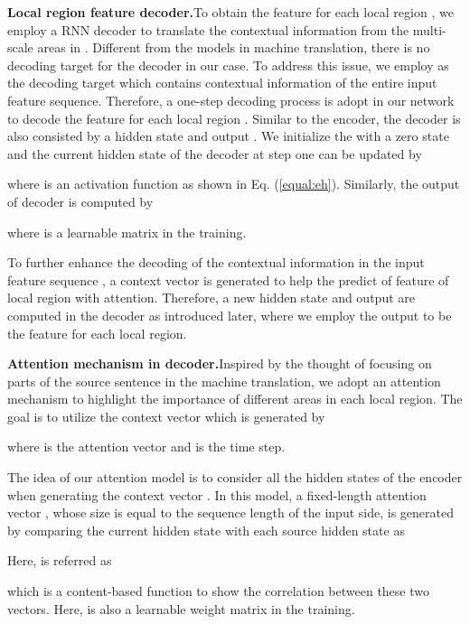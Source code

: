 \documentclass[letterpaper]{article}
\begin{document}
\noindent
\newline
\textbf{Local region feature decoder.}\quad To obtain the feature  for each local region , we employ a RNN decoder to translate the contextual information from the multi-scale areas in . 
Different from the models in machine translation, there is no decoding target for the decoder in our case.
To address this issue, we employ  as the decoding target which contains contextual information of the entire input feature sequence.
Therefore, a one-step decoding process is adopt in our network to decode the feature  for each local region .
Similar to the encoder, the decoder is also consisted by a hidden state  and output .
We initialize the  with a zero state  and the current hidden state of the decoder at step one can be updated by

where  is an activation function as shown in Eq. (\ref{equal:eh}).
Similarly, the output of decoder  is computed by

where  is a learnable matrix in the training.

To further enhance the decoding of the contextual information in the input feature sequence , a context vector  is generated to help the predict of feature  of local region with attention. Therefore, a new hidden state  and output  are computed in the decoder as introduced later, where we employ the output  to be the feature  for each local region. 





\noindent
\newline
\textbf{Attention mechanism in decoder.}\quad Inspired by the thought of focusing on parts of the source sentence in the machine translation, we adopt an attention mechanism to highlight the importance of different areas in each local region.
The goal is to utilize the context vector  which is generated by

where  is the attention vector and  is the time step.

The idea of our attention model is to consider all the hidden states of the encoder when generating the context vector .
In this model, a fixed-length attention vector , whose size is equal to the sequence length  of the input side, is generated by comparing the current hidden state  with each source hidden state  as

Here,  is referred as 

which is a content-based function to show the correlation between these two vectors. Here,  is also a learnable weight matrix in the training. 
\end{document}
